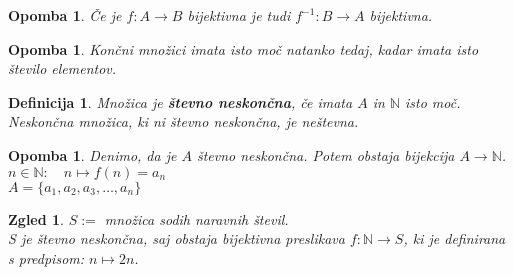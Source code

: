 \documentclass[11pt]{article}
\newtheorem{Definicija}[Izrek]{{\sc Definicija}}
\newtheorem{Zgled}[Izrek]{{\sc Zgled}}
\newtheorem{Opomba}[Izrek]{{\sc Opomba}}
\newenvironment{zgled}{\begin{Zgled}\rm }{\end{Zgled}}
\begin{document}
\begin{Opomba}
	Če je $f:A \to B$ bijektivna je tudi $f^{-1}: B\to A$ bijektivna.
\end{Opomba}
\begin{Opomba}
	Končni množici imata isto moč natanko tedaj, kadar imata isto število elementov.
\end{Opomba}
\begin{Definicija}
	Množica je \textbf{števno neskončna}, če imata $A$ in $\mathbb{N}$ isto moč. Neskončna množica, ki ni števno neskončna, je neštevna.
\end{Definicija}
\begin{Opomba}
	Denimo, da je $A$ števno neskončna. \newline Potem obstaja bijekcija  $A \to \mathbb{N}$.
	\\
	$n \in \mathbb{N}: \quad  n\mapsto  f(n) = a_n$
	\\
	$A = \{a_1, a_2, a_3, \dots, a_n\}$
\end{Opomba}
\begin{zgled}
	$ S := $ množica sodih naravnih števil.
	\\
	S je števno neskončna, saj obstaja bijektivna preslikava $f: \mathbb{N} \to S$, ki je definirana s predpisom: $n \mapsto 2n$.
\end{zgled}
\end{document}
